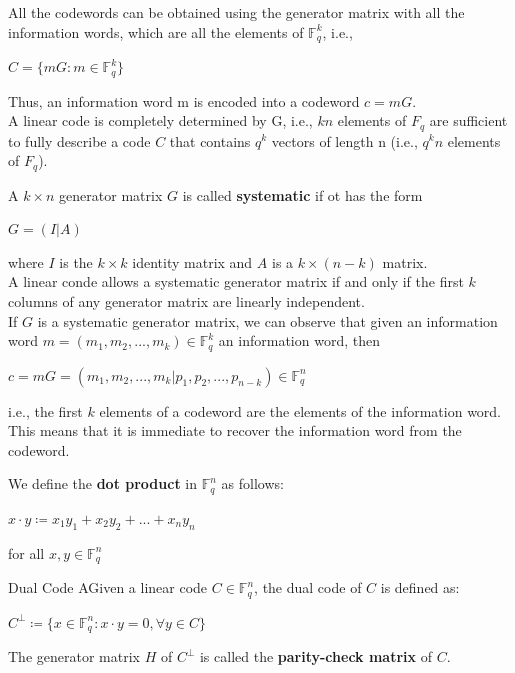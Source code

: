 \noindent
All the codewords can be obtained using the generator matrix with all the information words, which are all the elements of $\mathbb{F}_q^k$, i.e.,
\begin{center}
    $C = \{mG : m \in \mathbb{F}_q^k\}$
\end{center}
\noindent
Thus, an information word m is encoded into a codeword $c = mG$.\\
A linear code is completely determined by G, i.e., $kn$ elements of $F_q$ are sufficient to fully describe a code $C$ that contains $q^k$ vectors of length n (i.e., $q^k n$ elements of $F_q$).
\vspace{1 cm}

\noindent
A $k \times n$ generator matrix $G$ is called \textbf{systematic} if ot has the form
\begin{center}
    $G = (I|A)$
\end{center}
\noindent
where $I$ is the $k \times k$ identity matrix and $A$ is a $k \times (n-k)$ matrix.\\
A linear conde allows a systematic generator matrix if and only if the first $k$ columns of any generator matrix are linearly independent.\\
If $G$ is a systematic generator matrix, we can observe that given an information word $m = (m_1, m_2, ..., m_k) \in \mathbb{F}_q^k$ an information word, then
\begin{center}
    $c = mG = (m_1, m_2, ..., m_k | p_1, p_2, ..., p_{n-k}) \in \mathbb{F}_q^n$ 
\end{center}
i.e., the first $k$ elements of a codeword are the elements of the information word.\\
This means that it is immediate to recover the information word from the codeword.

\vspace{1 cm}
\noindent
We define the \textbf{dot product} in $\mathbb{F}_q^n$ as follows:
\begin{center}
    $x \cdot y \coloneqq x_1 y_1 + x_2 y_2 + ... + x_n y_n$
\end{center}
\noindent
for all $x , y \in \mathbb{F}_q^n$

\begin{defBox}{Dual Code}
    AGiven a linear code $C \in \mathbb{F}_q^n$, the dual code of $C$ is defined as:
    \begin{center}
        $C^\perp \coloneqq \{x \in \mathbb{F}_q^n : x \cdot y = 0, \forall y \in C\}$
    \end{center}

\noindent
The generator matrix $H$ of $C^\perp$ is called the \textbf{parity-check matrix} of $C$.
\end{defBox}
\medskip

